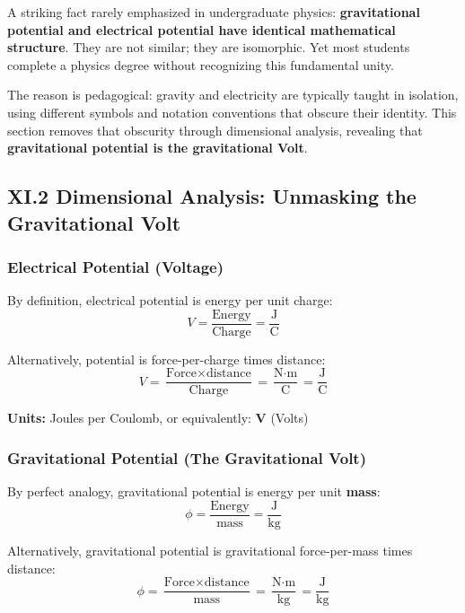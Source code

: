 \documentclass[
]{article}
\begin{document}
A striking fact rarely emphasized in undergraduate physics:
\textbf{gravitational potential and electrical potential have identical
mathematical structure}. They are not similar; they are isomorphic. Yet
most students complete a physics degree without recognizing this
fundamental unity.

The reason is pedagogical: gravity and electricity are typically taught
in isolation, using different symbols and notation conventions that
obscure their identity. This section removes that obscurity through
dimensional analysis, revealing that \textbf{gravitational potential is
the gravitational Volt}.

\subsection{XI.2 Dimensional Analysis: Unmasking the Gravitational
Volt}\label{xi.2-dimensional-analysis-unmasking-the-gravitational-volt}

\subsubsection{Electrical Potential
(Voltage)}\label{electrical-potential-voltage}

By definition, electrical potential is energy per unit charge:
\[V = \frac{\text{Energy}}{\text{Charge}} = \frac{\text{J}}{\text{C}}\]

Alternatively, potential is force-per-charge times distance:
\[V = \frac{\text{Force} \times \text{distance}}{\text{Charge}} = \frac{\text{N} \cdot \text{m}}{\text{C}} = \frac{\text{J}}{\text{C}}\]

\textbf{Units:} Joules per Coulomb, or equivalently: \textbf{V} (Volts)

\subsubsection{Gravitational Potential (The Gravitational
Volt)}\label{gravitational-potential-the-gravitational-volt}

By perfect analogy, gravitational potential is energy per unit
\textbf{mass}:
\[\phi = \frac{\text{Energy}}{\text{mass}} = \frac{\text{J}}{\text{kg}}\]

Alternatively, gravitational potential is gravitational force-per-mass
times distance:
\[\phi = \frac{\text{Force} \times \text{distance}}{\text{mass}} = \frac{\text{N} \cdot \text{m}}{\text{kg}} = \frac{\text{J}}{\text{kg}}\]
\end{document}
